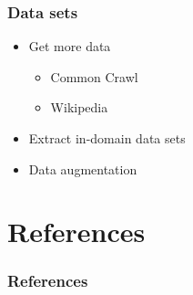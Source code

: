 \documentclass{beamer}
\begin{document}
\begin{frame}
    \frametitle{Data sets}
    \begin{itemize}
        \item Get more data
        \begin{itemize}
            \item Common Crawl
            \item Wikipedia
        \end{itemize}
    \item Extract in-domain data sets
    \item Data augmentation
    \end{itemize}
\end{frame}


\section{References}
\begin{frame}[allowframebreaks,t]
    \tiny
    \frametitle{References}
    
    
\end{frame}
\end{document}
